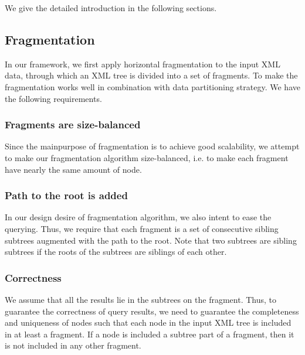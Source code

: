 We give the detailed introduction in the following sections.

\subsection{Fragmentation}

In our framework, we first apply horizontal fragmentation to the input XML data,
through which an XML tree is divided into a set of fragments. To make the 
fragmentation works well in combination with data partitioning strategy. We
have the following requirements.

\subsubsection{Fragments are size-balanced}

Since the mainpurpose of fragmentation is to achieve good scalability, we
attempt to make our fragmentation algorithm size-balanced, i.e. to make each
fragment have nearly the same amount of node. 

\subsubsection{Path to the root is added}

In our design desire of fragmentation algorithm, we also intent to ease the
querying. Thus, we require that each fragment is a set of consecutive
sibling subtrees augmented with the path to the root. Note that two
subtrees are sibling subtrees if the roots of the subtrees are siblings of each
other.

\subsubsection{Correctness}

We assume that all the results lie in the subtrees on the fragment. Thus,
to guarantee the correctness of query results, we need to guarantee the
completeness and uniqueness of nodes such that each node in the input XML tree
is included in at least a fragment. If a node is included a subtree part of a
fragment, then it is not included in any other fragment.


